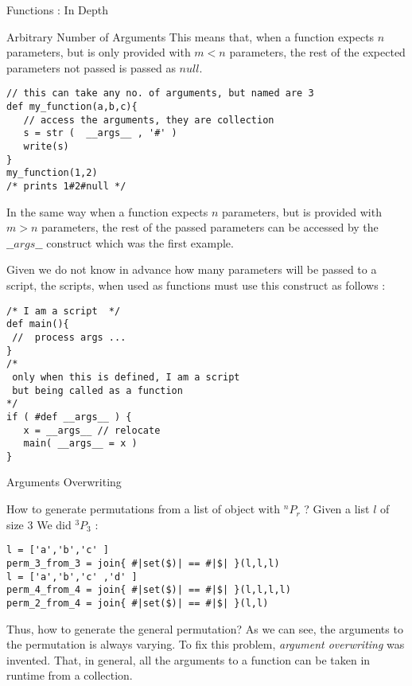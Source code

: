 \begin{section}{Functions : In Depth}
\begin{subsection}{Arbitrary Number of Arguments}
This means that, when a function expects $n$
parameters, but is only provided with $m < n $ parameters,
the rest of the expected  parameters not passed is passed as $null$.

\begin{lstlisting}[style=JexlStyle]
// this can take any no. of arguments, but named are 3 
def my_function(a,b,c){ 
   // access the arguments, they are collection  
   s = str (  __args__ , '#' )
   write(s)  
}
my_function(1,2)
/* prints 1#2#null */
\end{lstlisting}

In the same way when a function expects $n$
parameters, but is provided with $m > n $ parameters,
the rest of the passed  parameters can be accessed by the $\_\_args\_\_$ construct
 which was the first example.

Given we do not know in advance how many parameters will be passed 
to a script, the scripts, when used as functions must use this construct
as follows :

\begin{lstlisting}[style=JexlStyle]
/* I am a script  */
def main(){
 //  process args ...
}
/*
 only when this is defined, I am a script
 but being called as a function 
*/
if ( #def __args__ ) {
   x = __args__ // relocate 
   main( __args__ = x )
}
\end{lstlisting}
\end{subsection}

\begin{subsection}{Arguments Overwriting}

How to generate permutations from a list of object with 
$ ^nP_r$ ? Given a list $l$ of size $3$ We did $ ^3P_3$ :

\begin{center}\begin{minipage}{\linewidth}
\begin{lstlisting}[style=JexlStyle]
l = ['a','b','c' ]
perm_3_from_3 = join{ #|set($)| == #|$| }(l,l,l)
l = ['a','b','c' ,'d' ]
perm_4_from_4 = join{ #|set($)| == #|$| }(l,l,l,l)
perm_2_from_4 = join{ #|set($)| == #|$| }(l,l)
\end{lstlisting}
\end{minipage}\end{center}

Thus, how to generate the general permutation?
As we can see, the arguments to the permutation 
is always varying. To fix this problem, 
\emph{argument overwriting} was invented.
That, in general, all the arguments to a function 
can be taken in runtime from a collection.


\end{subsection}
\end{section}
